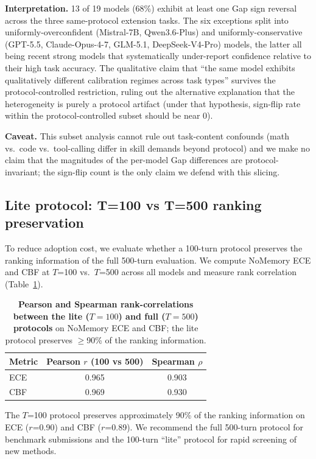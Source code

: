 \documentclass[11pt]{article}
\begin{document}
\textbf{Interpretation.} 13 of 19 models (68\%) exhibit at least one Gap sign reversal across the three same-protocol extension tasks. The six exceptions split into uniformly-overconfident (Mistral-7B, Qwen3.6-Plus) and uniformly-conservative (GPT-5.5, Claude-Opus-4-7, GLM-5.1, DeepSeek-V4-Pro) models, the latter all being recent strong models that systematically under-report confidence relative to their high task accuracy. The qualitative claim that ``the same model exhibits qualitatively different calibration regimes across task types'' survives the protocol-controlled restriction, ruling out the alternative explanation that the heterogeneity is purely a protocol artifact (under that hypothesis, sign-flip rate within the protocol-controlled subset should be near $0$).

\textbf{Caveat.} This subset analysis cannot rule out task-content confounds (math vs.\ code vs.\ tool-calling differ in skill demands beyond protocol) and we make no claim that the magnitudes of the per-model Gap differences are protocol-invariant; the sign-flip count is the only claim we defend with this slicing.

\subsection{Lite protocol: T=100 vs T=500 ranking preservation}

To reduce adoption cost, we evaluate whether a 100-turn protocol preserves the ranking information of the full 500-turn evaluation. We compute NoMemory ECE and CBF at $T$=100 vs.\ $T$=500 across all models and measure rank correlation (Table~\ref{tab:lite_protocol}).

\begin{table}[h]
\centering
\small
\caption{\textbf{Pearson and Spearman rank-correlations between the lite ($T{=}100$) and full ($T{=}500$) protocols} on NoMemory ECE and CBF; the lite protocol preserves $\geq$90\% of the ranking information.}
\label{tab:lite_protocol}
\begin{tabular}{lcc}
\toprule
\textbf{Metric} & \textbf{Pearson $r$ (100 vs 500)} & \textbf{Spearman $\rho$} \\
\midrule
ECE & 0.965 & 0.903 \\
CBF & 0.969 & 0.930 \\
\bottomrule
\end{tabular}
\end{table}

The $T$=100 protocol preserves approximately 90\% of the ranking information on ECE ($r$=0.90) and CBF ($r$=0.89). We recommend the full 500-turn protocol for benchmark submissions and the 100-turn ``lite'' protocol for rapid screening of new methods.
\end{document}
